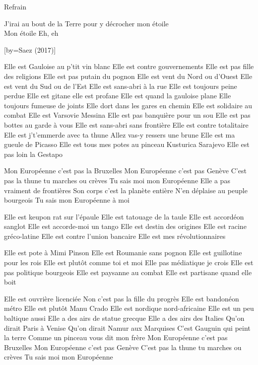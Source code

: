 \beginverse
Refrain
\endverse

\beginverse
J'irai au bout de la Terre pour y décrocher mon étoile\\[bis]
Mon étoile
Eh, eh \\[4x]
\endverse

[by={Saez (2017)}]

\beginverse
Elle est Gauloise au p’tit vin blanc
Elle est contre gouvernements
Elle est pas fille des religions
Elle est pas putain du pognon
Elle est vent du Nord ou d’Ouest
Elle est vent du Sud ou de l’Est
Elle est sans-abri à la rue
Elle est toujours peine perdue
Elle est gitane elle est profane
Elle est quand la gauloise plane
Elle toujours fumeuse de joints
Elle dort dans les gares en chemin
Elle est solidaire au combat
Elle est Varsovie Messina
Elle est pas banquière pour un sou
Elle est pas bottes au garde à vous
Elle est sans-abri sans frontière
Elle est contre totalitaire
Elle est j’t’emmerde avec ta thune
Allez vas-y ressers une brune
Elle est ma gueule de Picasso
Elle est tous mes potes au pinceau
Kusturica Sarajevo
Elle est pas loin la Gestapo
\endverse

\beginverse
Mon Européenne c’est pas la Bruxelles
Mon Européenne c’est pas Genève
C'est pas la thune tu marches ou crèves
Tu sais moi mon Européenne
Elle a pas vraiment de frontières
Son corps c’est la planète entière
N’en déplaise au peuple bourgeois
Tu sais mon Européenne à moi
\endverse

\beginverse
Elle est keupon rat sur l’épaule
Elle est tatouage de la taule
Elle est accordéon sanglot
Elle est accorde-moi un tango
Elle est destin des origines
Elle est racine gréco-latine
Elle est contre l’union bancaire
Elle est mes révolutionnaires
\endverse

\beginverse
Elle est pote à Mimi Pinson
Elle est Roumanie sans pognon
Elle est guillotine pour les rois
Elle est plutôt comme toi et moi
Elle pas médiatique je crois
Elle est pas politique bourgeois
Elle est paysanne au combat
Elle est partisane quand elle boit
\endverse

\beginverse
Elle est ouvrière licenciée
Non c’est pas la fille du progrès
Elle est bandonéon métro
Elle est plutôt Manu Crado
Elle est nordique nord-africaine
Elle est un peu baltique aussi
Elle a des airs de statue grecque
Elle a des airs des Italies
Qu’on dirait Paris à Venise
Qu’on dirait Namur aux Marquises
C’est Gauguin qui peint la terre
Comme un pinceau vous dit mon frère
Mon Européenne c’est pas Bruxelles
Mon Européenne c’est pas Genève
C'est pas la thune tu marches ou crèves
Tu sais moi mon Européenne
\endverse

